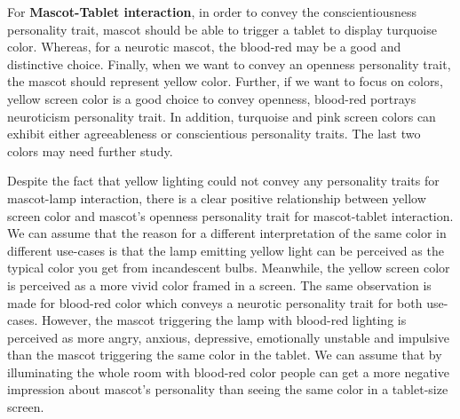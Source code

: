 \par For \textbf{Mascot-Tablet interaction}, in order to convey the conscientiousness personality trait, mascot should be able to trigger a tablet to display turquoise color. Whereas, for a neurotic mascot, the blood-red may be a good and distinctive choice. Finally, when we want to convey an openness personality trait, the mascot should represent yellow color. Further, if we want to focus on colors, yellow screen color is a good choice to convey openness, blood-red portrays neuroticism personality trait. In addition, turquoise and pink screen colors can exhibit either agreeableness or conscientious personality traits. The last two colors may need further study.
\par Despite the fact that yellow lighting could not convey any personality traits for mascot-lamp interaction, there is a clear positive relationship between yellow screen color and mascot’s openness personality trait for mascot-tablet interaction. We can assume that the reason for a different interpretation of the same color in different use-cases is that the lamp emitting yellow light can be perceived as the typical color you get from incandescent bulbs. Meanwhile, the yellow screen color is perceived as a more vivid color framed in a screen. The same observation is made for blood-red color which conveys a neurotic personality trait for both use-cases. However, the mascot triggering the lamp with blood-red lighting is perceived as more angry, anxious, depressive, emotionally unstable and impulsive than the mascot triggering the same color in the tablet. We can assume that by illuminating the whole room with blood-red color people can get a more negative impression about mascot’s personality than seeing the same color in a tablet-size screen.
